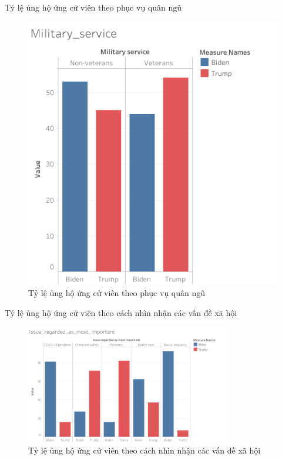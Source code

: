\documentclass[10pt]{beamer}
\theoremstyle{remark}
\theoremstyle{definition}
\begin{document}
\begin{frame}{Tỷ lệ ủng hộ ứng cử viên theo phục vụ quân ngũ}
	\begin{figure}[h!]
        \centering
        \includegraphics[height=0.7\textheight]{figures/Military_service.png}
        \caption{Tỷ lệ ủng hộ ứng cử viên theo phục vụ quân ngũ}
    \end{figure}
\end{frame}

\begin{frame}{Tỷ lệ ủng hộ ứng cử viên theo cách nhìn nhận các vấn đề xã hội}
	\begin{figure}[h!]
        \centering
        \includegraphics[width=0.8\textwidth]{figures/Issue_regarded_as_most_important.png}
        \caption{Tỷ lệ ủng hộ ứng cử viên theo cách nhìn nhận các vấn đề xã hội}
    \end{figure}
\end{frame}
\end{document}
